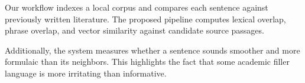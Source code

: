 Our workflow indexes a local corpus and compares each sentence against previously written literature. The proposed pipeline computes lexical overlap, phrase overlap, and vector similarity against candidate source passages.

Additionally, the system measures whether a sentence sounds smoother and more formulaic than its neighbors. This highlights the fact that some academic filler language is more irritating than informative.
